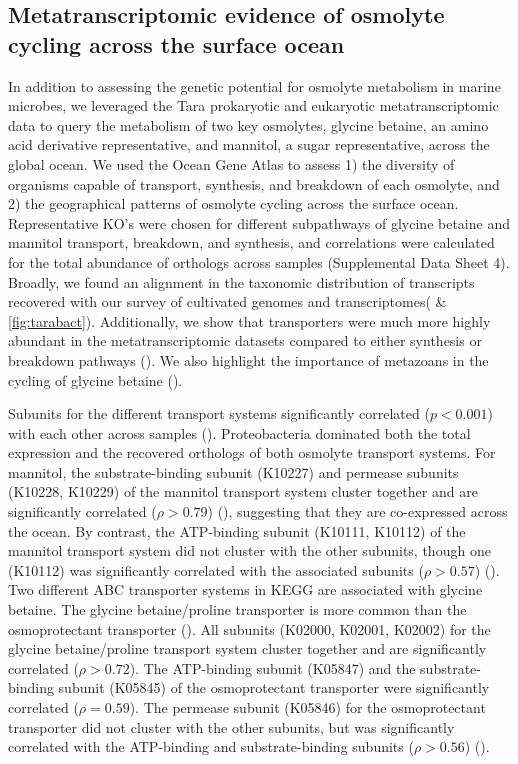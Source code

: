 \documentclass[utf8]{frontiersSCNS} %
\begin{document}
\subsection{Metatranscriptomic evidence of osmolyte cycling across the surface ocean}

In addition to assessing the genetic potential for osmolyte metabolism in marine microbes, we leveraged the Tara prokaryotic and eukaryotic metatranscriptomic data \citep{Salazar_2019, Carradec2018} to query the metabolism of two key osmolytes, glycine betaine, an amino acid derivative representative, and mannitol, a sugar representative, across the global ocean. We used the Ocean Gene Atlas \citep{Villar_2018} to assess 1) the diversity of organisms capable of transport, synthesis, and breakdown of each osmolyte, and 2) the geographical patterns of osmolyte cycling across the surface ocean. Representative KO's were chosen for different subpathways of glycine betaine and mannitol transport, breakdown, and synthesis, and correlations were calculated for the total abundance of orthologs across samples (Supplemental Data Sheet 4). Broadly, we found an alignment in the taxonomic distribution of transcripts recovered with our survey of cultivated genomes and transcriptomes( \& \ref{fig:tarabact}). Additionally, we show that transporters were much more highly abundant in the metatranscriptomic datasets compared to either synthesis or breakdown pathways (). We also highlight the importance of metazoans in the cycling of glycine betaine (). 

Subunits for the different transport systems significantly correlated ($p<0.001$) with each other across samples (). Proteobacteria dominated both the total expression and the recovered orthologs of both osmolyte transport systems. For mannitol, the substrate-binding subunit (K10227) and permease subunits (K10228, K10229) of the mannitol transport system cluster together and are significantly correlated ($\rho > 0.79$)  (), suggesting that they are co-expressed across the ocean. By contrast, the ATP-binding subunit (K10111, K10112) of the mannitol transport system did not cluster with the other subunits, though one (K10112) was significantly correlated with the associated subunits ($\rho >0.57$) (). Two different ABC transporter systems in KEGG are associated with glycine betaine. The glycine betaine/proline transporter is more common than the osmoprotectant transporter (). All subunits (K02000, K02001, K02002) for the glycine betaine/proline transport system cluster together and are significantly correlated ($\rho >0.72$). The ATP-binding subunit (K05847) and the substrate-binding subunit (K05845) of the osmoprotectant transporter were significantly correlated ($\rho=0.59$). The permease subunit (K05846) for the osmoprotectant transporter did not cluster with the other subunits, but was significantly correlated with the ATP-binding and substrate-binding subunits ($\rho>0.56$) (). 
\end{document}
